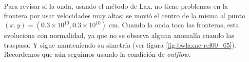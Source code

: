\documentclass[12pt,a4paper]{book}
\begin{document}
Para revisar si la onda, usando el método de Lax, no tiene problemas en la frontera por usar velocidades muy altas; se movió el centro de la misma al punto $(x,y) = (0.3 \times 10^{10}, 0.3 \times 10^{10})$ cm. Cuando la onda toca las fronteras, esta evoluciona con normalidad, ya que no se observa alguna anomalía cuando las traspasa. Y sigue manteniendo su simetría (ver figura \ref{fig:bwlaxnc-rel00_65}). Recordemos que aún seguimos usando la condición de \emph{outflow}.

\begin{figure}
\centering
{}

\end{figure}
\end{document}
